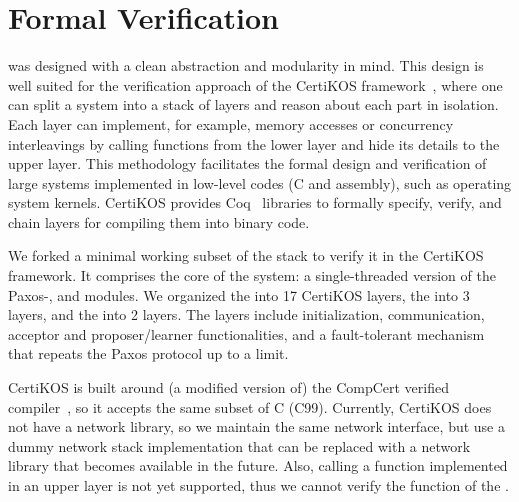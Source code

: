 \section{Formal Verification}

\sysname was designed with a clean abstraction and modularity in mind. This
design is well suited for the verification approach of the CertiKOS
framework~\cite{deepspec, certikos:osdi16}, where
one can split a system into a stack of layers and reason about each part in
isolation. Each layer can implement, for example, memory accesses or concurrency
interleavings by calling functions from the lower layer and hide its details to
the upper layer.
This methodology facilitates the formal design and verification of large systems
implemented in low-level codes (C and assembly), such as operating system
kernels. CertiKOS provides Coq~\cite{coq} libraries to formally specify, verify,
and chain layers for compiling them into binary code.

We forked a minimal working subset of the \sysname{} stack to verify it in the
CertiKOS framework. It comprises the core of the system: a single-threaded
version of the Paxos-\WOR{}, \WOS{} and \wormspace{} modules. We organized the
\WOR{} into 17 CertiKOS layers, the \WOS{} into 3 layers, and the \wormspace{}
into 2 layers. The \WOR{} layers include initialization, communication, acceptor
and proposer/learner functionalities, and a fault-tolerant mechanism that
repeats the Paxos protocol up to a limit.

CertiKOS is built around (a modified version of) the CompCert verified
compiler~\cite{compcert,leroy09,deepspec}, so it accepts the same subset of C
(C99). Currently, CertiKOS does not have a network library, so we maintain the
same network interface, but use a dummy network stack implementation that can be
replaced with a network library that becomes available in the future. Also,
calling a function implemented in an upper layer is not yet supported, thus we
cannot verify the  function of the \WOS{}.


